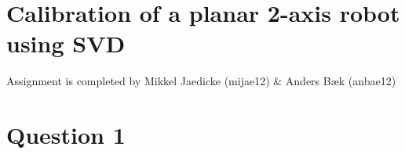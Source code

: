 \section*{Calibration of a planar 2-axis robot using SVD}
Assignment is completed by Mikkel Jaedicke (mijae12) \& Anders Bæk (anbae12)
\section*{Question 1}